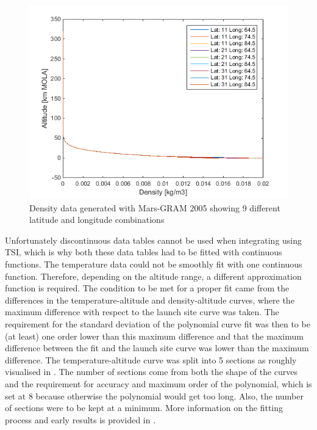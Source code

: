 \begin{figure}[!ht]
\centering
\includegraphics[width=1.0\textwidth]{figures/software/densityData.png}
\caption{Density data generated with Mars-\ac{GRAM} 2005 showing 9 different latitude and longitude combinations}
\label{fig:densityData}
\end{figure}

Unfortunately discontinuous data tables cannot be used when integrating using \ac{TSI}, which is why both these data tables had to be fitted with continuous functions. The temperature data could not be smoothly fit with one continuous function.  Therefore, depending on the altitude range, a different approximation function is required. The condition to be met for a proper fit came from the differences in the temperature-altitude and density-altitude curves, where the maximum difference with respect to the launch site curve was taken. The requirement for the standard deviation of the polynomial curve fit was then to be (at least) one order lower than this maximum difference and that the maximum difference between the fit and the launch site curve was lower than the maximum difference. The temperature-altitude curve was split into 5 sections as roughly visualised in . The number of sections come from both the shape of the curves and the requirement for accuracy and maximum order of the polynomial, which is set at 8 because otherwise the polynomial would get too long. Also, the number of sections were to be kept at a minimum. More information on the fitting process and early results is provided in .

